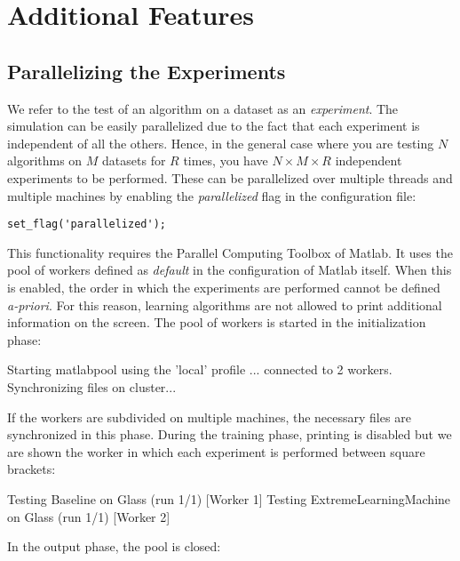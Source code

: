 \chapter{Additional Features}
\label{chap:additionalfeatures}

\section{Parallelizing the Experiments}

We refer to the test of an algorithm on a dataset as an \textit{experiment}. The simulation can be easily parallelized due to the fact that each experiment is independent of all the others. Hence, in the general case where you are testing $N$ algorithms on $M$ datasets for $R$ times, you have $N \times M \times R$ independent experiments to be performed. These can be parallelized over multiple threads and multiple machines by enabling the \textit{parallelized} flag in the configuration file:

\begin{lstlisting}
set_flag('parallelized');
\end{lstlisting}

\noindent This functionality requires the Parallel Computing Toolbox of Matlab. It uses the pool of workers defined as \textit{default} in the configuration of Matlab itself. When this is enabled, the order in which the experiments are performed cannot be defined \textit{a-priori}. For this reason, learning algorithms are not allowed to print additional information on the screen. The pool of workers is started in the initialization phase:

\begin{console}
Starting matlabpool using the 'local' profile ... 
	connected to 2 workers.
Synchronizing files on cluster...
\end{console}

\noindent If the workers are subdivided on multiple machines, the necessary files are synchronized in this phase. During the training phase, printing is disabled but we are shown the worker in which each experiment is performed between square brackets:

\begin{console}
Testing Baseline on Glass (run 1/1) [Worker 1]
Testing ExtremeLearningMachine on Glass (run 1/1) [Worker 2]
\end{console}

\noindent In the output phase, the pool is closed:

